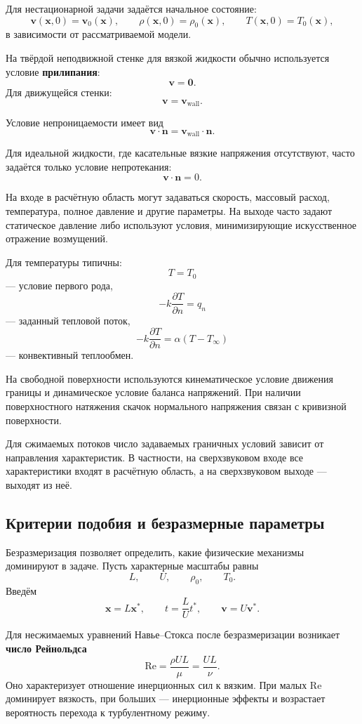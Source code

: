 Для нестационарной задачи задаётся начальное состояние:
\[
\mathbf{v}(\mathbf{x},0)=\mathbf{v}_0(\mathbf{x}),
\qquad
\rho(\mathbf{x},0)=\rho_0(\mathbf{x}),
\qquad
T(\mathbf{x},0)=T_0(\mathbf{x}),
\]
в зависимости от рассматриваемой модели.

На твёрдой неподвижной стенке для вязкой жидкости обычно используется условие
\textbf{прилипания}:
\[
\mathbf{v}=\mathbf{0}.
\]
Для движущейся стенки:
\[
\mathbf{v}=\mathbf{v}_{\mathrm{wall}}.
\]

Условие непроницаемости имеет вид
\[
\mathbf{v}\cdot\mathbf{n}
=
\mathbf{v}_{\mathrm{wall}}\cdot\mathbf{n}.
\]

Для идеальной жидкости, где касательные вязкие напряжения отсутствуют, часто задаётся только условие непротекания:
\[
\mathbf{v}\cdot\mathbf{n}=0.
\]

На входе в расчётную область могут задаваться скорость, массовый расход, температура, полное давление и другие параметры. На выходе часто задают статическое давление либо используют условия, минимизирующие искусственное отражение возмущений.

Для температуры типичны:
\[
T=T_0
\]
--- условие первого рода,
\[
-k\frac{\partial T}{\partial n}=q_n
\]
--- заданный тепловой поток,
\[
-k\frac{\partial T}{\partial n}
=
\alpha(T-T_{\infty})
\]
--- конвективный теплообмен.

На свободной поверхности используются кинематическое условие движения границы и динамическое условие баланса напряжений. При наличии поверхностного натяжения скачок нормального напряжения связан с кривизной поверхности.

Для сжимаемых потоков число задаваемых граничных условий зависит от направления характеристик. В частности, на сверхзвуковом входе все характеристики входят в расчётную область, а на сверхзвуковом выходе --- выходят из неё.

\subsection{Критерии подобия и безразмерные параметры}

Безразмеризация позволяет определить, какие физические механизмы доминируют в задаче. Пусть характерные масштабы равны
\[
L,\qquad U,\qquad \rho_0,\qquad T_0.
\]
Введём
\[
\mathbf{x}=L\mathbf{x}^*,
\qquad
t=\frac{L}{U}t^*,
\qquad
\mathbf{v}=U\mathbf{v}^*.
\]

Для несжимаемых уравнений Навье--Стокса после безразмеризации возникает \textbf{число Рейнольдса}
\[
\mathrm{Re}
=
\frac{\rho U L}{\mu}
=
\frac{UL}{\nu}.
\]
Оно характеризует отношение инерционных сил к вязким. При малых $\mathrm{Re}$ доминирует вязкость, при больших --- инерционные эффекты и возрастает вероятность перехода к турбулентному режиму.

